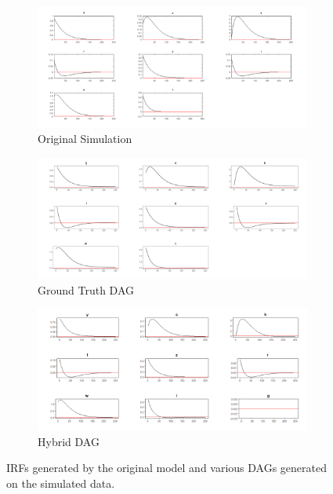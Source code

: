 \documentclass{article}
\begin{document}
\begin{figure}

  \centering
  \begin{subfigure}{0.8\textwidth}
    \centering
    \includegraphics[width=\linewidth]{images/rbc_sim_irf.png} 
    \caption{Original Simulation}
    \label{simirf}
  \end{subfigure}
  \begin{subfigure}{0.8\textwidth}
    \centering  
    \includegraphics[width=\linewidth]{images/rbc_true_dag_irfs.png}
    \caption{Ground Truth DAG}
    \label{gtirf}
  \end{subfigure}
  \begin{subfigure}{0.8\textwidth}
    \centering  
    \includegraphics[width=\linewidth]{images/rbc_hybrid_irfs.png}
    \caption{Hybrid DAG}
    \label{hirf}
  \end{subfigure}

  \caption{IRFs generated by the original model and various DAGs generated on the simulated data.}
  \label{dag10}
\end{figure}
\end{document}
